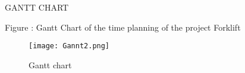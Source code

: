 \documentclass[../report.tex]{subfiles}
\begin{document}
    GANTT CHART


 Figure : Gantt Chart of the time planning of the project Forklift

 \begin{figure}[h!]
    \centering
    \texttt{[image: Gannt2.png]}
    \caption{Gantt chart}
 \end{figure}
  
\end{document}
